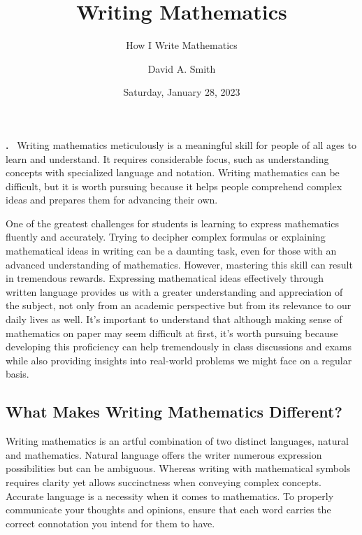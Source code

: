 \documentclass[
  twoside,
  12pt,
  letterpaper,
  fleqn]{article}
\title{Writing Mathematics}
\subtitle{How I Write Mathematics}
\author{David A. Smith}
\date{Saturday, January 28, 2023}
\renewenvironment{abstract}
{\par\noindent\textbf{\abstractname.}\ \ignorespaces}
{\par\medskip }
\begin{document}
\maketitle
\begin{abstract}
Writing mathematics meticulously is a meaningful skill for people of all
ages to learn and understand. It requires considerable focus, such as
understanding concepts with specialized language and notation. Writing
mathematics can be difficult, but it is worth pursuing because it helps
people comprehend complex ideas and prepares them for advancing their
own.
\end{abstract}
\ifdefined\Shaded\renewenvironment{Shaded}{\begin{tcolorbox}[breakable, boxrule=0pt, interior hidden, frame hidden, borderline west={3pt}{0pt}{shadecolor}, enhanced, sharp corners]}{\end{tcolorbox}}\fi

One of the greatest challenges for students is learning to express
mathematics fluently and accurately. Trying to decipher complex formulas
or explaining mathematical ideas in writing can be a daunting task, even
for those with an advanced understanding of mathematics. However,
mastering this skill can result in tremendous rewards. Expressing
mathematical ideas effectively through written language provides us with
a greater understanding and appreciation of the subject, not only from
an academic perspective but from its relevance to our daily lives as
well. It's important to understand that although making sense of
mathematics on paper may seem difficult at first, it's worth pursuing
because developing this proficiency can help tremendously in class
discussions and exams while also providing insights into real-world
problems we might face on a regular basis.

\hypertarget{what-makes-writing-mathematics-different}{%
\subsection{What Makes Writing Mathematics
Different?}\label{what-makes-writing-mathematics-different}}

Writing mathematics is an artful combination of two distinct languages,
natural and mathematics. Natural language offers the writer numerous
expression possibilities but can be ambiguous. Whereas writing with
mathematical symbols requires clarity yet allows succinctness when
conveying complex concepts. Accurate language is a necessity when it
comes to mathematics. To properly communicate your thoughts and
opinions, ensure that each word carries the correct connotation you
intend for them to have.
\end{document}
